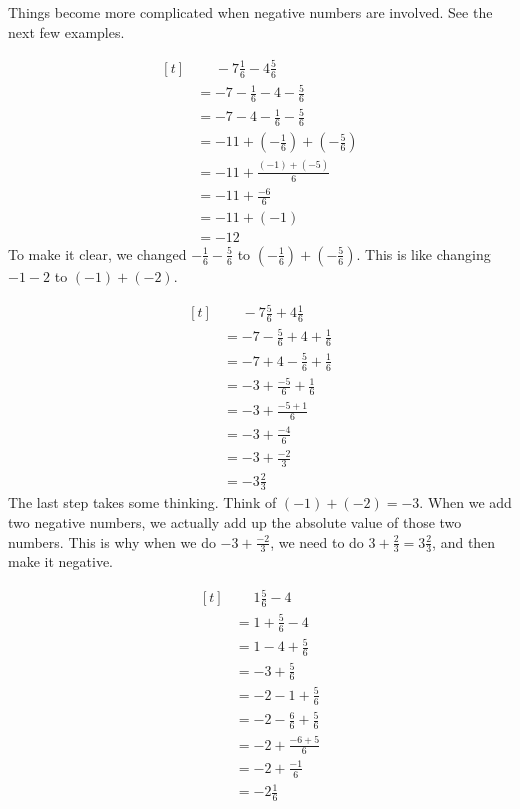 Things become more complicated when negative numbers are involved. See the next few examples.

\begin{myexample}
\[ 
\begin{aligned}[t]
	&\phantom{{}=}-7\frac{1}{6}-4\frac{5}{6} \\
	&= -7-\frac{1}{6}-4-\frac{5}{6} \\
	&= -7-4-\frac{1}{6}-\frac{5}{6} \\
	&= -11+(-\frac{1}{6})+(-\frac{5}{6}) \\
	&= -11+\frac{(-1)+(-5)}{6} \\
	&= -11+\frac{-6}{6} \\
	&= -11+(-1) \\
	&= -12
\end{aligned}
\]
To make it clear, we changed $-\frac{1}{6}-\frac{5}{6}$ to $(-\frac{1}{6})+(-\frac{5}{6})$. This is like changing $-1-2$ to $(-1)+(-2)$.
\end{myexample}

\begin{myexample}
\[ 
\begin{aligned}[t]
	&\phantom{{}=}-7\frac{5}{6}+4\frac{1}{6} \\
	&= -7-\frac{5}{6}+4+\frac{1}{6} \\
	&= -7+4-\frac{5}{6}+\frac{1}{6} \\
	&= -3+\frac{-5}{6}+\frac{1}{6} \\
	&= -3+\frac{-5+1}{6} \\
	&= -3+\frac{-4}{6} \\
	&= -3+\frac{-2}{3} \\
	&= -3\frac{2}{3}
\end{aligned}
\]
The last step takes some thinking. Think of $(-1)+(-2)=-3$. When we add two negative numbers, we actually add up the absolute value of those two numbers. This is why when we do $-3+\frac{-2}{3}$, we need to do $3+\frac{2}{3}=3\frac{2}{3}$, and then make it negative.
\end{myexample}

\begin{myexample}
\[ 
\begin{aligned}[t]
	&\phantom{{}=}1\frac{5}{6}-4 \\
	&= 1+\frac{5}{6}-4 \\
	&= 1-4+\frac{5}{6} \\
	&= -3+\frac{5}{6} \\
	&= -2 -1 + \frac{5}{6} \\
	&= -2 -\frac{6}{6} + \frac{5}{6} \\
	&= -2 + \frac{-6+5}{6} \\
	&= -2 + \frac{-1}{6} \\
	&= -2\frac{1}{6}
\end{aligned}
\]
\end{myexample}


